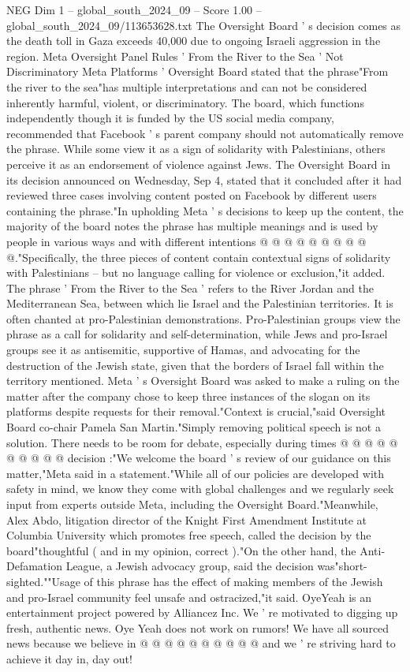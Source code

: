 \begin{textsample}{NEG Dim 1 – global\_south\_2024\_09 – Score 1.00 – global\_south\_2024\_09/113653628.txt}  \label{ex:f1_neg_248}
The Oversight Board ' s decision comes as the death toll in Gaza exceeds 40,000 due to ongoing Israeli aggression in the region.
Meta Oversight Panel Rules ' From the River to the Sea ' Not Discriminatory Meta Platforms ' Oversight Board stated that the phrase"From the river to the sea"has multiple interpretations and can not be considered inherently harmful, violent, or discriminatory.
The board, which functions independently though it is funded by the US social media company, recommended that Facebook ' s parent company should not automatically remove the phrase.
While some view it as a sign of solidarity with Palestinians, others perceive it as an endorsement of violence against Jews.
The Oversight Board in its decision announced on Wednesday, Sep 4, stated that it concluded after it had reviewed three cases involving content posted on Facebook by different users containing the phrase."In upholding Meta ' s decisions to keep up the content, the majority of the board notes the phrase has multiple meanings and is used by people in various ways and with different intentions @ @ @ @ @ @ @ @ @ @."Specifically, the three pieces of content contain contextual signs of solidarity with Palestinians -- but no language calling for violence or exclusion,"it added.
The phrase ' From the River to the Sea ' refers to the River Jordan and the Mediterranean Sea, between which lie Israel and the Palestinian territories.
It is often chanted at pro-Palestinian demonstrations.
Pro-Palestinian groups view the phrase as a call for solidarity and self-determination, while Jews and pro-Israel groups see it as antisemitic, supportive of Hamas, and advocating for the destruction of the Jewish state, given that the borders of Israel fall within the territory mentioned.
Meta ' s Oversight Board was asked to make a ruling on the matter after the company chose to keep three instances of the slogan on its platforms despite requests for their removal."Context is crucial,"said Oversight Board co-chair Pamela San Martin."Simply removing political speech is not a solution.
There needs to be room for debate, especially during times @ @ @ @ @ @ @ @ @ @ decision :"We welcome the board ' s review of our guidance on this matter,"Meta said in a statement."While all of our policies are developed with safety in mind, we know they come with global challenges and we regularly seek input from experts outside Meta, including the Oversight Board."Meanwhile, Alex Abdo, litigation director of the Knight First Amendment Institute at Columbia University which promotes free speech, called the decision by the board"thoughtful ( and in my opinion, correct )."On the other hand, the Anti-Defamation League, a Jewish advocacy group, said the decision was"short-sighted.""Usage of this phrase has the effect of making members of the Jewish and pro-Israel community feel unsafe and ostracized,"it said.
OyeYeah is an entertainment project powered by Alliancez Inc.
We ' re motivated to digging up fresh, authentic news.
Oye Yeah does not work on rumors!
We have all sourced news because we believe in @ @ @ @ @ @ @ @ @ @ and we ' re striving hard to achieve it day in, day out!

\end{textsample}
